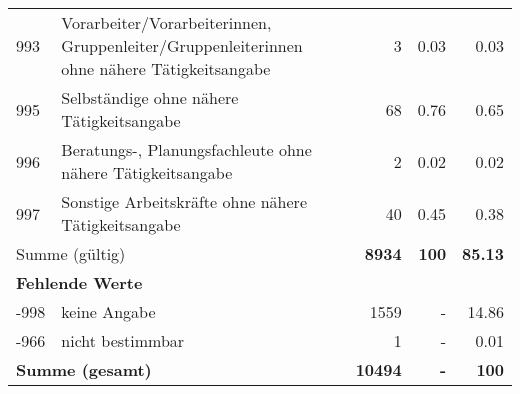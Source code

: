 \begin{longtable}{lXrrr}
        993 & \multicolumn{1}{X}{Vorarbeiter/Vorarbeiterinnen, Gruppenleiter/Gruppenleiterinnen ohne nähere Tätigkeitsangabe} & %
          \num{3} &
          \num[round-mode=places,round-precision=2]{0.03} &
          \num[round-mode=places,round-precision=2]{0.03} \\

        995 & \multicolumn{1}{X}{Selbständige ohne nähere Tätigkeitsangabe} & %
          \num{68} &
          \num[round-mode=places,round-precision=2]{0.76} &
          \num[round-mode=places,round-precision=2]{0.65} \\

        996 & \multicolumn{1}{X}{Beratungs-, Planungsfachleute ohne nähere Tätigkeitsangabe} & %
          \num{2} &
          \num[round-mode=places,round-precision=2]{0.02} &
          \num[round-mode=places,round-precision=2]{0.02} \\

        997 & \multicolumn{1}{X}{Sonstige Arbeitskräfte ohne nähere Tätigkeitsangabe} & %
          \num{40} &
          \num[round-mode=places,round-precision=2]{0.45} &
          \num[round-mode=places,round-precision=2]{0.38} \\

     \midrule
     \multicolumn{2}{l}{Summe (gültig)} &
       \textbf{\num{8934}} &
     \textbf{\num{100}} &
       \textbf{\num[round-mode=places,round-precision=2]{85.13}} \\
     \multicolumn{5}{l}{\textbf{Fehlende Werte}}\\
       -998 &
       keine Angabe &
         \num{1559} &
        - &
         \num[round-mode=places,round-precision=2]{14.86} \\
       -966 &
       nicht bestimmbar &
         \num{1} &
        - &
         \num[round-mode=places,round-precision=2]{0.01} \\
     \midrule
     \multicolumn{2}{l}{\textbf{Summe (gesamt)}} &
          \textbf{\num{10494}} &
        \textbf{-} &
        \textbf{\num{100}} \\
     \bottomrule
     \end{longtable}
     
